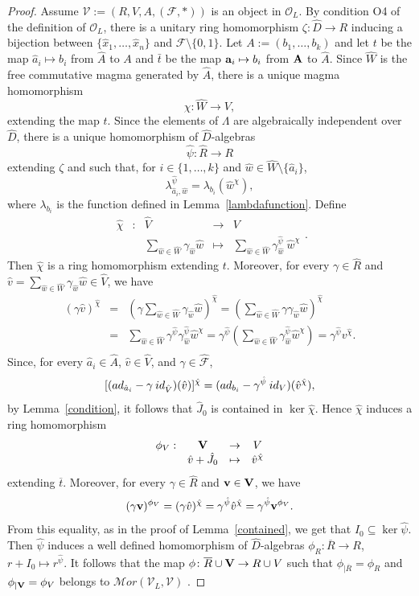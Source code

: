 \documentclass[10pt,a4paper]{amsart}
\newcommand{\A}{ {\hat A}}
\newcommand{\Amo}{{\mathcal {\bf A}}}
\newcommand{\Ro}{{\overline R}}
\newcommand{\Vo}{{\bf V}}
\newcommand{\aR}{{\hat R}}
\newcommand{\aV}{{\hat V}}
\newcommand{\ad}{{\rm ad}}
\newcommand{\ba}{{\bf a}}
\newcommand{\bv}{{\bf v}}
\newcommand{\hJ}{{\hat J}}
\newcommand{\hW}{{\hat W}}
\newcommand{\ha}{{\hat a}}
\newcommand{\hv}{{\hat v}}
\newcommand{\hw}{{\hat w}}
\begin{document}
\begin{proof}
Assume  ${\mathcal  V}:=(R, V, A, (\mathcal F, \ast))$ is an object in $\mathcal O_L$. By condition O4 of the definition of $\mathcal O_L$, there is a unitary ring homomorphism  $\zeta:\hat D\to R$  inducing a bijection between $\{\hat x_1,  \ldots , \hat x_n\}$ and $\mathcal F\setminus \{0,1\}$. Let $A:=(b_1, \ldots , b_k)$ and let $t$ be the map $\ha_i\mapsto b_i$ from $\A$ to $A$ and 
$
\bar t$ be the map $\ba_i\mapsto b_i$ from $\Amo$ to $\A$. Since $\hW$ is the free commutative magma generated by $\A$, there is a unique magma homomorphism 
$$\chi:\hW\to V,$$ extending the map $t$. Since the elements of $\Lambda$ are algebraically independent over $\hat D$, there is a unique homomorphism of $\hat D$-algebras 
 $$\hat \psi :\aR\to R$$ extending $\zeta$ and 
  such that,  for $i\in \{1,\ldots , k\}$ and  $\hw \in \hW\setminus \{\ha_i\}$,  
  \begin{equation}\label{lambdax}
 \lambda_{\ha_i, \hw}^{\hat \psi}=\lambda_{b_i}(\hw^\chi),
 \end{equation}
  where $\lambda_{b_i}$ is the function defined in Lemma~\ref{lambdafunction}.  Define 
$$
\begin{array}{rcccc}
\hat \chi &:& \aV& \to &V\\
& & \sum_{\hw\in \hW}\gamma_\hw \hw & \mapsto & \sum_{\hw\in \hW}\gamma_\hw^{\hat \psi}\: \hw^\chi
\end{array}.
$$
Then $\hat \chi$ is a ring homomorphism extending $t$. Moreover,  for every $\gamma\in \aR$ and $\hv=\sum_{\hw\in \hW}\gamma_\hw \hw\in \aV$, we have 
\begin{eqnarray*}
(\gamma  \hv)^{\hat \chi}&=&(\gamma \sum_{\hw\in \hW} \gamma_\hw \hw)^{\hat\chi}=( \sum_{\hw\in \hW} \gamma \gamma_\hw \hw)^{\hat\chi}\\
&=&\sum_{\hw\in \hW}\gamma^{\hat \psi} \gamma_\hw^{\hat \psi} \hw^\chi=\gamma^{\hat \psi}(\sum_{\hw\in \hW} \gamma_\hw^{\hat \psi} \hw^\chi)=\gamma^{\hat \psi} v^{\hat \chi}.\\
\end{eqnarray*}
Since, for every $\ha_i \in \A$, $\hv\in \aV$, and $\gamma \in \hat {\mathcal F}$,
$$
 [ (\ad_{\ha_i}-\gamma\: {\rm id}_\aV) (\hv)]^{\hat \chi} =(\ad_{b_i}-\gamma^{\hat \psi}\: {\rm id}_{V}) (\hv^{\hat \chi}),
$$
by Lemma~\ref{condition}, it follows that $\hJ_0$ is contained in $\ker \hat \chi$. Hence $\hat \chi$ induces a ring homomorphism 
$$\begin{array}{rccc}
\phi_V : &\Vo& \to &V\\
& \hv+\hJ_0 & \mapsto & \hv^{\hat \chi}
\end{array}
$$
 extending $\overline t$. Moreover,  for every $\gamma\in \aR$ and ${\bv}\in \Vo$,  we have
$$
(\gamma \bv)^{\phi_{V}}=(\gamma \hv)^{\hat\chi}=\gamma^{\hat \psi} \hv^{\hat \chi}=\gamma^{\hat \psi} {\bv}^{\phi_{V}}. 
$$
From this equality, as in the proof of Lemma~\ref{contained}, we get that $I_0\subseteq \ker \hat \psi$. Then  $\hat \psi$ induces a well defined homomorphism of $\hat D$-algebras $\phi_{R}:\Ro\to R$, $r+I_0\mapsto r^{\hat\psi}$. It follows that  the map $\phi\colon \Ro\cup \Vo \to R\cup V$ such that $\phi_{|\Ro}=\phi_R$ and $\phi_{|\Vo}=\phi_V$ belongs to ${\mathcal Mor}({\mathcal V}_L, \mathcal V)$ . 


\end{proof}
\end{document}
